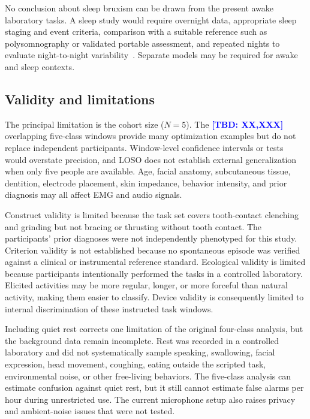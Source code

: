 \documentclass[pdflatex,sn-nature,iicol]{sn-jnl}
\newcommand{\TBD}[1]{\textcolor{blue}{\textbf{[TBD: #1]}}}
\begin{document}
\color{blue}
No conclusion about sleep bruxism can be drawn from the present awake laboratory tasks. A sleep study would require overnight data, appropriate sleep staging and event criteria, comparison with a suitable reference such as polysomnography or validated portable assessment, and repeated nights to evaluate night-to-night variability~\cite{cidverdejo2024instrumental}. Separate models may be required for awake and sleep contexts.
\color{black}

\color{blue}
\subsection{Validity and limitations}
\color{black}

\color{blue}
The principal limitation is the cohort size ($N=5$). The \TBD{XX,XXX} overlapping five-class windows provide many optimization examples but do not replace independent participants. Window-level confidence intervals or tests would overstate precision, and LOSO does not establish external generalization when only five people are available. Age, facial anatomy, subcutaneous tissue, dentition, electrode placement, skin impedance, behavior intensity, and prior diagnosis may all affect EMG and audio signals.
\color{black}

\color{blue}
Construct validity is limited because the task set covers tooth-contact clenching and grinding but not bracing or thrusting without tooth contact. The participants' prior diagnoses were not independently phenotyped for this study. Criterion validity is not established because no spontaneous episode was verified against a clinical or instrumental reference standard. Ecological validity is limited because participants intentionally performed the tasks in a controlled laboratory. Elicited activities may be more regular, longer, or more forceful than natural activity, making them easier to classify. Device validity is consequently limited to internal discrimination of these instructed task windows.
\color{black}

\color{blue}
Including quiet rest corrects one limitation of the original four-class analysis, but the background data remain incomplete. Rest was recorded in a controlled laboratory and did not systematically sample speaking, swallowing, facial expression, head movement, coughing, eating outside the scripted task, environmental noise, or other free-living behaviors. The five-class analysis can estimate confusion against quiet rest, but it still cannot estimate false alarms per hour during unrestricted use. The current microphone setup also raises privacy and ambient-noise issues that were not tested.
\color{black}
\end{document}
